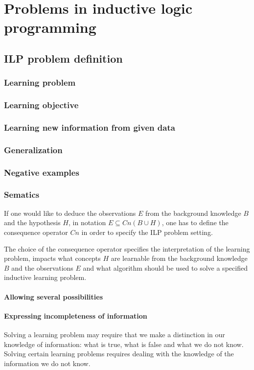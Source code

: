 \chapter{Problems in inductive logic programming}

\section{ILP problem definition}
\subsection{Learning problem}
\subsection{Learning objective}
\subsection{Learning new information from given data}
\subsection{Generalization}
\subsection{Negative examples}
\subsection{Sematics}
If one would like to deduce the observations $E$ from the background knowledge $B$ and the hypothesis $H$, in notation $E \subseteq Cn(B \cup H)$, one has to define the consequence operator $Cn$ in order to specify the ILP problem setting.

The choice of the consequence operator specifies the interpretation of the learning problem, impacts what concepts $H$ are learnable from the background knowledge $B$ and the observations $E$ and what algorithm should be used to solve a specified inductive learning problem.

\subsubsection{Allowing several possibilities}


\subsubsection{Expressing incompleteness of information}
Solving a learning problem may require that we make a distinction in our knowledge of information: what is true, what is false and what we do not know.
Solving certain learning problems requires dealing with the knowledge of the information we do not know.

